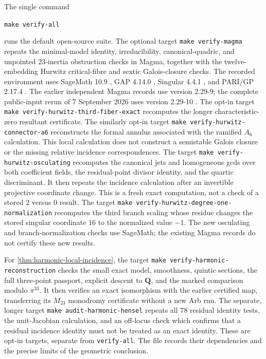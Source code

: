 \documentclass[11pt]{amsart}
\theoremstyle{definition}
\theoremstyle{remark}
\newcommand{\QQ}{\mathbf Q}
\begin{document}
The single command
\par\vspace{4pt}
{\centering\texttt{make verify-all}\par}
\par\vspace{4pt}
runs the default open-source suite.  The optional target
\texttt{make verify-magma} repeats the minimal-model identity,
irreducibility, canonical-quadric, and unpointed $23$-inertia obstruction checks
in Magma, together with the twelve-embedding Hurwitz critical-fibre and
sextic Galois-closure checks.
The recorded environment uses SageMath 10.9 \cite{SageMath}, GAP 4.14.0
\cite{GAP}, Singular 4.4.1 \cite{Singular}, and PARI/GP 2.17.4
\cite{PARI}.  The earlier independent Magma records use version 2.29-9;
the complete public-input rerun of 7 September 2026 uses version 2.29-10
\cite{Magma}.
The opt-in target \texttt{make verify-hurwitz-third-fiber-exact} recomputes
the longer characteristic-zero resultant certificate.  The similarly
opt-in target \texttt{make verify-hurwitz-connector-a6} reconstructs the
formal annulus associated with the ramified $A_6$ calculation.  This local
calculation does not construct a semistable Galois closure or the missing
relative incidence correspondences.
The target \texttt{make verify-hurwitz-osculating} recomputes the
canonical jets and homogeneous gcds over both coefficient fields,
the residual-point divisor identity, and the quartic discriminant.
It then repeats the incidence calculation after an invertible
projective coordinate change.
This is a fresh exact computation, not a check of a stored
$2$ versus $0$ result.
The target \texttt{make verify-hurwitz-degree-one-normalization}
recomputes the third branch scaling whose residue changes the
stored singular coordinate $16$ to the normalized value $-1$.
The new osculating and branch-normalization checks use SageMath;
the existing Magma records do not certify these new results.

For \cref{thm:harmonic-local-incidence}, the target
\texttt{make verify-harmonic-reconstruction} checks the small exact
model, smoothness, quintic sections, the full three-point passport,
explicit descent to $\QQ$, and the marked comparison modulo $\pi^{33}$.
It then verifies an exact isomorphism with the earlier certified map,
transferring its $M_{23}$ monodromy certificate without a new Arb run.
The separate, longer target \texttt{make audit-harmonic-hensel}
repeats all $78$ residual identity tests, the unit-Jacobian calculation,
and an off-locus check which confirms that a residual incidence
identity must not be treated as an exact identity.
These are opt-in targets, separate from \texttt{verify-all}.
The file  records their dependencies
and the precise limits of the geometric conclusion.
\end{document}
